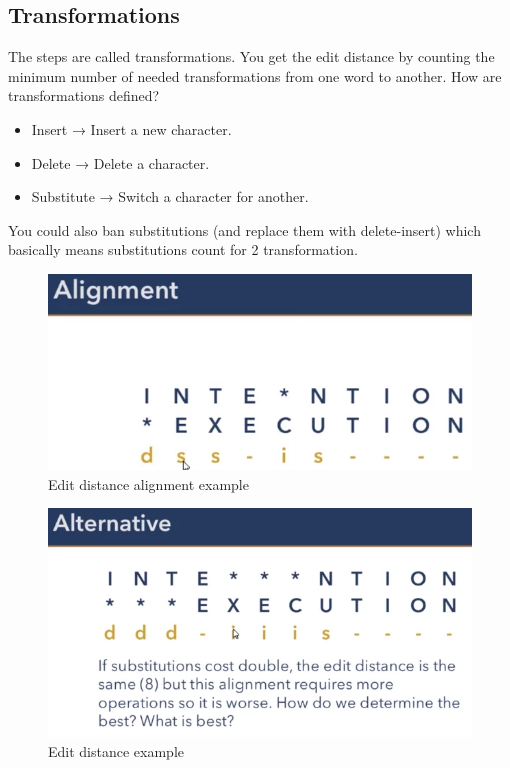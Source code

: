 \documentclass[
  11pt,
  british,
]{article}
\providecommand{\tightlist}{%
  \setlength{\itemsep}{0pt}\setlength{\parskip}{0pt}}
\begin{document}
\hypertarget{transformations}{%
\subsection{Transformations}\label{transformations}}

The steps are called transformations. You get the edit distance by
counting the minimum number of needed transformations from one word to
another. How are transformations defined?

\begin{itemize}
\tightlist
\item
  Insert → Insert a new character.
\item
  Delete → Delete a character.
\item
  Substitute → Switch a character for another.
\end{itemize}

You could also ban substitutions (and replace them with delete-insert)
which basically means substitutions count for 2 transformation.

\begin{figure}
\centering
\includegraphics{Pasted_image_20220217165311.png}
\caption{Edit distance alignment example}
\end{figure}

\begin{figure}
\centering
\includegraphics{Pasted_image_20220217165328.png}
\caption{Edit distance example}
\end{figure}
\end{document}
